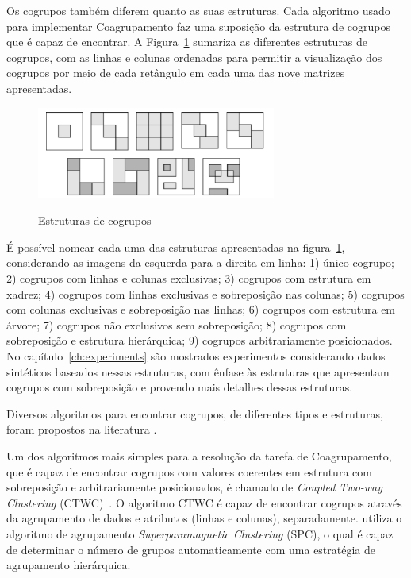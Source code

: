 \documentclass[
    12pt,                %
    oneside,            %
    a4paper,            %
    english,            %
    brazil                %
    ]{abntex2ppgsi}
\begin{document}
Os cogrupos também diferem quanto as suas estruturas.
Cada algoritmo usado para implementar Coagrupamento faz uma suposição da estrutura de cogrupos que é capaz de encontrar.
A Figura~\ref{fig:bicstruct} sumariza as diferentes estruturas de cogrupos, com as linhas e colunas ordenadas para permitir a visualização dos cogrupos por meio de cada retângulo em cada uma das nove matrizes apresentadas.

\begin{figure}[H]
\centering
    \caption{Estruturas de cogrupos}
    \includegraphics[width=0.7\textwidth]{img/synteticBiclusters.png}
    \label{fig:bicstruct}
\end{figure}

É possível nomear cada uma das estruturas apresentadas na figura~\ref{fig:bicstruct}, considerando as imagens da esquerda para a direita em linha: 1) único cogrupo; 2) cogrupos com linhas e colunas exclusivas; 3) cogrupos com estrutura em xadrez; 4) cogrupos com linhas exclusivas e sobreposição nas colunas; 5) cogrupos com colunas exclusivas e sobreposição nas linhas; 6) cogrupos com estrutura em árvore; 7) cogrupos não exclusivos sem sobreposição; 8) cogrupos com sobreposição e estrutura hierárquica; 9) cogrupos arbitrariamente posicionados.
No capítulo~\ref{ch:experiments} são mostrados experimentos considerando dados sintéticos baseados nessas estruturas, com ênfase às estruturas que apresentam cogrupos com sobreposição e provendo mais detalhes dessas estruturas.

Diversos algoritmos para encontrar cogrupos, de diferentes tipos e estruturas, foram propostos na literatura \cite{Tanay2005,Madeira2004}.

Um dos algoritmos mais simples para a resolução da tarefa de Coagrupamento, que é capaz de encontrar cogrupos com valores coerentes em estrutura com sobreposição e arbitrariamente posicionados, é chamado de \textit{Coupled Two-way Clustering} (CTWC)~\cite{Getz2000}.
O algoritmo CTWC é capaz de encontrar cogrupos através da agrupamento de dados e atributos (linhas e colunas), separadamente.
 utiliza o algoritmo de agrupamento \textit{Superparamagnetic Clustering} (SPC), o qual é capaz de determinar o número de grupos automaticamente com uma estratégia de agrupamento hierárquica.
\end{document}
